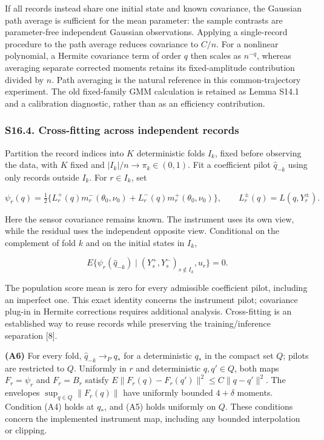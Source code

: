 \documentclass[
  american,
  11pt,
]{article}
\begin{document}
If all records instead share one initial state and known covariance, the
Gaussian path average is sufficient for the mean parameter: the sample
contrasts are parameter-free independent Gaussian observations. Applying
a single-record procedure to the path average reduces covariance to
\(C/n\). For a nonlinear polynomial, a Hermite covariance term of order
\(q\) then scales as \(n^{-q}\), whereas averaging separate corrected
moments retains its fixed-amplitude contribution divided by \(n\). Path
averaging is the natural reference in this common-trajectory experiment.
The old fixed-family GMM calculation is retained as Lemma S14.1 and a
calibration diagnostic, rather than as an efficiency contribution.

\subsubsection{S16.4. Cross-fitting across independent
records}\label{s16.4.-cross-fitting-across-independent-records}

Partition the record indices into \(K\) deterministic folds \(I_k\),
fixed before observing the data, with \(K\) fixed and
\(|I_k|/n\to\pi_k\in(0,1)\). Fit a coefficient pilot \(\widehat q_{-k}\)
using only records outside \(I_k\). For \(r\in I_k\), set

\[
\psi_r(q)=\tfrac12\{L_r^+(q)m_r^-(\theta_0,\nu_0)+L_r^-(q)m_r^+(\theta_0,\nu_0)\},
\qquad L_r^\pm(q)=L(q,Y_r^\pm).
\]

Here the sensor covariance remains known. The instrument uses its own
view, while the residual uses the independent opposite view. Conditional
on the complement of fold \(k\) and on the initial states in \(I_k\),

\[
E\{\psi_r(\widehat q_{-k})\mid (Y_s^+,Y_s^-)_{s\notin I_k},u_r\}=0.
\]

The population score mean is zero for every admissible coefficient
pilot, including an imperfect one. This exact identity concerns the
instrument pilot; covariance plug-in in Hermite corrections requires
additional analysis. Cross-fitting is an established way to reuse
records while preserving the training/inference separation {[}8{]}.

\textbf{(A6)} For every fold, \(\widehat q_{-k}\to_P q_*\) for a
deterministic \(q_*\) in the compact set \(Q\); pilots are restricted to
\(Q\). Uniformly in \(r\) and deterministic \(q,q'\in Q\), both maps
\(F_r=\psi_r\) and \(F_r=B_r\) satisfy
\(E\|F_r(q)-F_r(q')\|^2\le C\|q-q'\|^2\). The envelopes
\(\sup_{q\in Q}\|F_r(q)\|\) have uniformly bounded \(4+\delta\) moments.
Condition (A4) holds at \(q_*\), and (A5) holds uniformly on \(Q\).
These conditions concern the implemented instrument map, including any
bounded interpolation or clipping.
\end{document}
